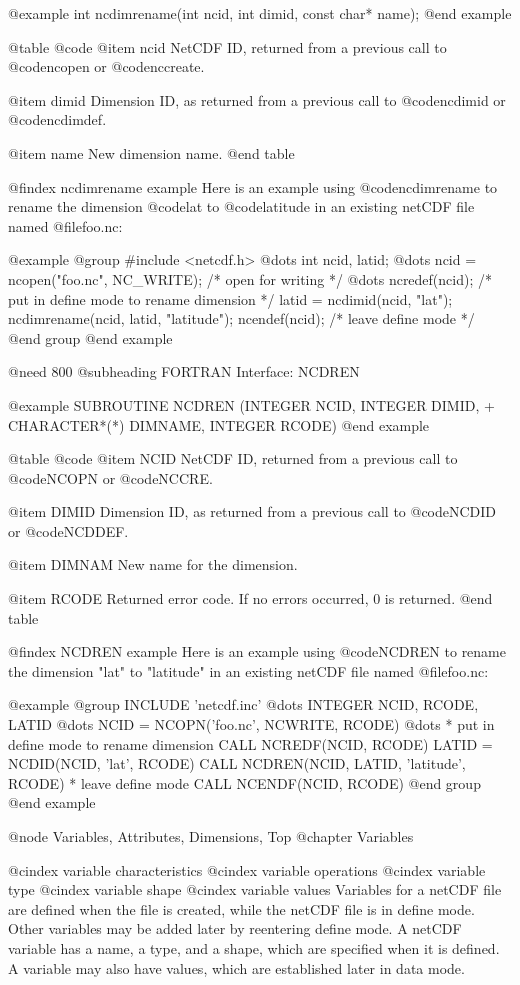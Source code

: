 @example
int ncdimrename(int ncid, int dimid, const char* name);
@end example

@table @code
@item ncid
NetCDF ID, returned from a previous call to @code{ncopen} or @code{nccreate}.

@item dimid
Dimension ID, as returned from a previous call to @code{ncdimid} or @code{ncdimdef}.

@item name
New dimension name.
@end table

@findex ncdimrename example
Here is an example using @code{ncdimrename} to rename the dimension
@code{lat} to @code{latitude} in an existing netCDF file named @file{foo.nc}:

@example
@group
#include <netcdf.h>
   @dots{}
int ncid, latid;
   @dots{}
ncid = ncopen("foo.nc", NC_WRITE);  /* open for writing */
   @dots{}
ncredef(ncid);  /* put in define mode to rename dimension */
latid = ncdimid(ncid, "lat");
ncdimrename(ncid, latid, "latitude");
ncendef(ncid);  /* leave define mode */
@end group
@end example

@need 800
@subheading FORTRAN Interface:  NCDREN

@example
      SUBROUTINE NCDREN (INTEGER NCID, INTEGER DIMID,
     +                   CHARACTER*(*) DIMNAME, INTEGER RCODE)
@end example

@table @code
@item NCID
NetCDF ID, returned from a previous call to @code{NCOPN} or @code{NCCRE}.

@item DIMID
Dimension ID, as returned from a previous call to @code{NCDID} or
@code{NCDDEF}.

@item DIMNAM
New name for the dimension.

@item RCODE
Returned error code.  If no errors occurred, 0 is returned.
@end table

@findex NCDREN example
Here is an example using @code{NCDREN} to rename the dimension
"lat" to "latitude" in an existing netCDF file named @file{foo.nc}:

@example
@group
      INCLUDE 'netcdf.inc'
         @dots{}
      INTEGER NCID, RCODE, LATID
         @dots{}
      NCID = NCOPN('foo.nc', NCWRITE, RCODE)
         @dots{}
* put in define mode to rename dimension
      CALL NCREDF(NCID, RCODE)
      LATID = NCDID(NCID, 'lat', RCODE)
      CALL NCDREN(NCID, LATID, 'latitude', RCODE)
* leave define mode
      CALL NCENDF(NCID, RCODE)
@end group
@end example

@node Variables, Attributes, Dimensions, Top
@chapter Variables

@cindex variable characteristics
@cindex variable operations
@cindex variable type
@cindex variable shape
@cindex variable values
Variables for a netCDF file are defined when the file is created, while the
netCDF file is in define mode.  Other variables may be added later
by reentering define mode.  A netCDF variable has a name, a type, and a
shape, which are specified when it is defined.  A variable may also have
values, which are established later in data mode.

